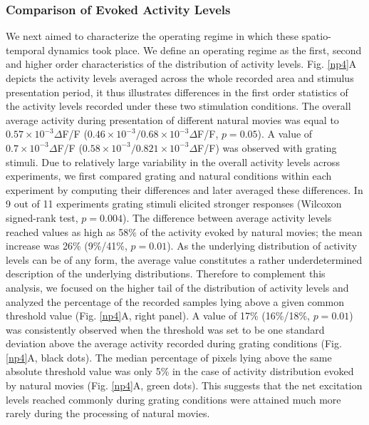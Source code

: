 \subsubsection{Comparison of Evoked Activity Levels} 

\label{oi_operationpoint}

We next aimed to characterize the operating regime in which these
spatio-temporal dynamics took place. We define an operating regime as the
first, second and higher order characteristics of the distribution of
activity levels. Fig. \ref{np4}A depicts the activity levels averaged
across the whole recorded area and stimulus presentation period, it thus
illustrates differences in the first order statistics of the activity
levels recorded under these two stimulation conditions. The overall average
activity during presentation of different natural movies was equal to $0.57
\times 10^{-3} \Delta$F/F ($0.46\times 10^{-3} / 0.68\times 10^{-3}
\Delta$F/F, $p = 0.05$). A value of $0.7 \times 10^{-3} \Delta$F/F
($0.58\times 10^{-3} / 0.821\times 10^{-3} \Delta$F/F) was observed with
grating stimuli. Due to relatively large variability in the overall
activity levels across experiments, we first compared grating and natural
conditions within each experiment by computing their differences and later
averaged these differences. In 9 out of 11 experiments grating stimuli
elicited stronger responses (Wilcoxon signed-rank test, $p = 0.004$). The
difference between average activity levels reached values as high as 58\%
of the activity evoked by natural movies; the mean increase was 26\%
(9\%/41\%, $p = 0.01$). As the underlying distribution of activity levels
can be of any form, the average value constitutes a rather underdetermined
description of the underlying distributions. Therefore to complement this
analysis, we focused on the higher tail of the distribution of activity
levels and analyzed the percentage of the recorded samples lying above a
given common threshold value (Fig. \ref{np4}A, right panel). A value of
17\% (16\%/18\%, $p = 0.01$) was consistently observed when the threshold
was set to be one standard deviation above the average activity recorded
during grating conditions (Fig. \ref{np4}A, black dots). The median
percentage of pixels lying above the same absolute threshold value was only
5\% in the case of activity distribution evoked by natural movies (Fig.
\ref{np4}A, green dots). This suggests that the net excitation levels
reached commonly during grating conditions were attained much more rarely
during the processing of natural movies. 

